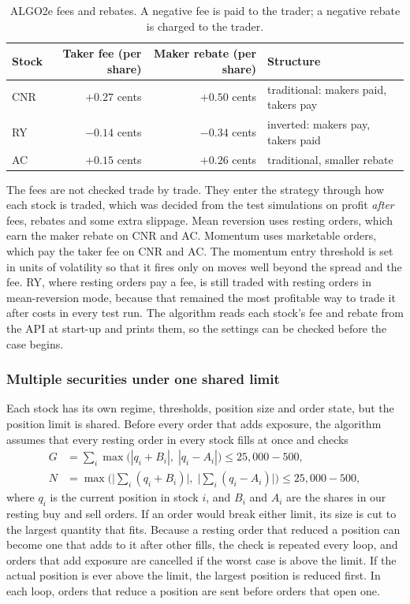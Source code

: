 \documentclass{article}
\begin{document}
\begin{table}[H]
\centering
\begin{tabular}{lrrl}
\toprule
Stock & Taker fee (per share) & Maker rebate (per share) & Structure \\
\midrule
CNR & $+0.27$ cents & $+0.50$ cents & traditional: makers paid, takers pay \\
RY  & $-0.14$ cents & $-0.34$ cents & inverted: makers pay, takers paid \\
AC  & $+0.15$ cents & $+0.26$ cents & traditional, smaller rebate \\
\bottomrule
\end{tabular}
\caption{ALGO2e fees and rebates. A negative fee is paid to the trader; a negative rebate is charged to the trader.}
\label{tab:algo2e_fees}
\end{table}

\noindent The fees are not checked trade by trade. They enter the strategy through how each stock is traded, which was decided from the test simulations on profit \emph{after} fees, rebates and some extra slippage. Mean reversion uses resting orders, which earn the maker rebate on CNR and AC. Momentum uses marketable orders, which pay the taker fee on CNR and AC. The momentum entry threshold is set in units of volatility so that it fires only on moves well beyond the spread and the fee. RY, where resting orders pay a fee, is still traded with resting orders in mean-reversion mode, because that remained the most profitable way to trade it after costs in every test run. The algorithm reads each stock's fee and rebate from the API at start-up and prints them, so the settings can be checked before the case begins.

\subsubsection*{Multiple securities under one shared limit}

Each stock has its own regime, thresholds, position size and order state, but the position limit is shared. Before every order that adds exposure, the algorithm assumes that every resting order in every stock fills at once and checks
\begin{align}
G &= \sum_{i} \max\big(|q_i + B_i|,\; |q_i - A_i|\big) \le 25{,}000 - 500, \\
N &= \max\Big(\big|\textstyle\sum_i (q_i + B_i)\big|,\; \big|\textstyle\sum_i (q_i - A_i)\big|\Big) \le 25{,}000 - 500,
\end{align}
where $q_i$ is the current position in stock $i$, and $B_i$ and $A_i$ are the shares in our resting buy and sell orders. If an order would break either limit, its size is cut to the largest quantity that fits. Because a resting order that reduced a position can become one that adds to it after other fills, the check is repeated every loop, and orders that add exposure are cancelled if the worst case is above the limit. If the actual position is ever above the limit, the largest position is reduced first. In each loop, orders that reduce a position are sent before orders that open one.
\end{document}
